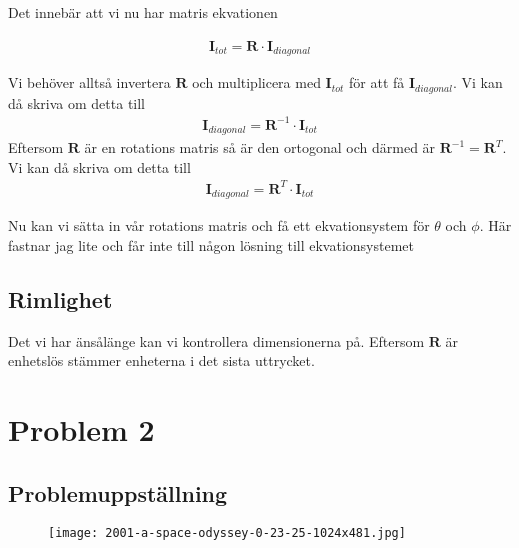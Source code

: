 \documentclass[a4paper]{article}
\begin{document}
Det innebär att vi nu har matris ekvationen

\begin{align*}
    \mathbf{I}_{tot} = \mathbf{R}\cdot \mathbf{I}_{diagonal}
\end{align*}

Vi behöver alltså invertera $\mathbf{R}$ och multiplicera med $\mathbf{I}_{tot}$ för att få $\mathbf{I}_{diagonal}$. Vi kan då skriva om detta till
\begin{align*}
    \mathbf{I}_{diagonal} = \mathbf{R}^{-1}\cdot \mathbf{I}_{tot}
\end{align*}
Eftersom $\mathbf{R}$ är en rotations matris så är den ortogonal och därmed är $\mathbf{R}^{-1} = \mathbf{R}^T$. Vi kan då skriva om detta till
\begin{align*}
    \mathbf{I}_{diagonal} = \mathbf{R}^T\cdot \mathbf{I}_{tot}
\end{align*}

Nu kan vi sätta in vår rotations matris och få ett ekvationsystem för $\theta$ och $\phi$. Här fastnar jag lite och får inte till någon lösning till ekvationsystemet

\subsection*{Rimlighet}
Det vi har änsålänge kan vi kontrollera dimensionerna på. Eftersom $\mathbf{R}$ är enhetslös stämmer enheterna i det sista uttrycket. 



\section*{Problem 2}

\subsection*{Problemuppställning}
\begin{figure}[H]
    \begin{small}
        \begin{center}
            \texttt{[image: 2001-a-space-odyssey-0-23-25-1024x481.jpg]}
        \end{center}
        \caption{}
        \label{fig:}
    \end{small}
\end{figure}
\end{document}
